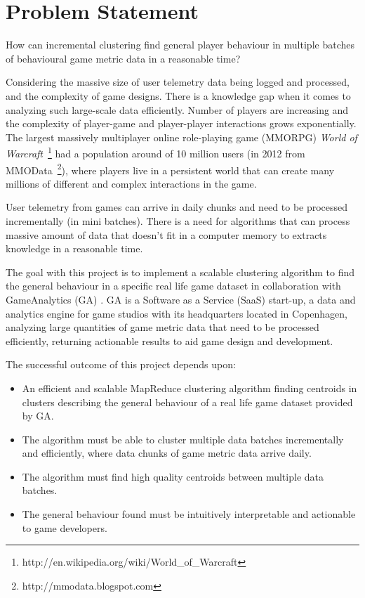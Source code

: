 \section{Problem Statement}
{\addtolength{\leftskip}{5mm} How can incremental clustering find general player behaviour in multiple batches of behavioural game metric data in a reasonable time? \par}

Considering the massive size of user telemetry data being logged and processed, and the complexity of game designs. There is a knowledge gap when it comes to analyzing such large-scale data efficiently. Number of players are increasing and the complexity of player-game and player-player interactions grows exponentially. The largest massively multiplayer online role-playing game (MMORPG) \textit{World of Warcraft}~\footnote{http://en.wikipedia.org/wiki/World\_of\_Warcraft} had a population around of 10 million users (in 2012 from MMOData~\footnote{http://mmodata.blogspot.com}), where players live in a persistent world that can create many millions of different and complex interactions in the game. 

User telemetry from games can arrive in daily chunks and need to be processed incrementally (in mini batches). There is a need for algorithms that can process massive amount of data that doesn't fit in a computer memory to extracts knowledge in a reasonable time. 

The goal with this project is to implement a scalable clustering algorithm to find the general behaviour in a specific real life game dataset in collaboration with GameAnalytics (GA) \citep{GA2013}. GA is a Software as a Service (SaaS) start-up, a data and analytics engine for game studios with its headquarters located in Copenhagen, analyzing large quantities of game metric data that need to be processed efficiently, returning actionable results to aid game design and development.  

The successful outcome of this project depends upon:
\begin{itemize}
\item An efficient and scalable MapReduce clustering algorithm finding centroids in clusters describing the general behaviour of a real life game dataset provided by GA.
\item The algorithm must be able to cluster multiple data batches incrementally and efficiently, where data chunks of game metric data arrive daily.
\item The algorithm must find high quality centroids between multiple data batches.
\item The general behaviour found must be intuitively interpretable and actionable to game developers.
\end{itemize}

